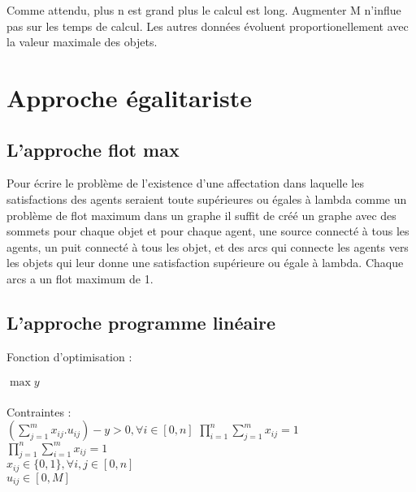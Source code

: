 \documentclass[paper=a4, fontsize=11pt]{scrartcl} %
\numberwithin{equation}{section} %
\numberwithin{figure}{section} %
\numberwithin{table}{section} %
\begin{document}
Comme attendu, plus n est grand plus le calcul est long.
Augmenter M n'influe pas sur les temps de calcul. 
Les autres donn\'ees \'evoluent proportionellement avec la valeur maximale des objets. 


\newpage
\section{Approche \'egalitariste}

\subsection{L'approche flot max}

Pour \'ecrire le probl\`eme de l'existence d'une affectation dans laquelle les satisfactions des agents seraient toute sup\'erieures ou \'egales \`a lambda comme un probl\`eme de flot maximum dans un graphe il suffit de cr\'e\'e un graphe avec des sommets pour chaque objet et pour chaque agent, une source connect\'e \`a tous les agents, un puit connect\'e \`a tous les objet, et des arcs qui connecte les agents vers les objets qui leur donne une satisfaction sup\'erieure ou \'egale \`a lambda. Chaque arcs a un flot maximum de 1.


\subsection{L'approche programme lin\'eaire}

Fonction d'optimisation : \\\\
$\max y$\\\\
Contraintes :\\

$(\sum_{j=1}^{m}x_{ij}.u_{ij})-y > 0, \forall i \in [0,n]$
$\prod_{i=1}^{n}\sum_{j=1}^{m}x_{ij} = 1$\\
$\prod_{j=1}^{n}\sum_{i=1}^{m}x_{ij} = 1$\\
$x_{ij}\in\{0,1\}, \forall i,j\in[0,n]$\\
$u_{ij}\in[0,M]$

\end{document}
